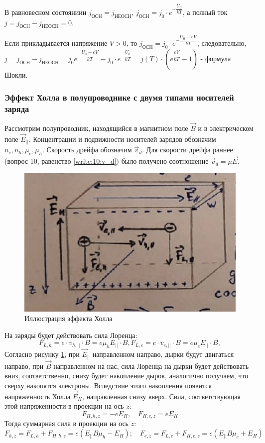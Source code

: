В равновесном состояниии $j_\text{ОСН} = j_\text{НЕОСН}$, $j_\text{ОСН} = j_0 \cdot e^{-\dfrac{U_0}{kT}}$, а полный ток $j = j_\text{ОСН} - j_\text{НЕОСН} = 0$.

Если прикладывается напряжение $V>0$, то $j_\text{ОСН} = j_0 \cdot e^{-\dfrac{U_0-eV}{kT}}$, следовательно, $j = j_\text{ОСН} - j_\text{НЕОСН} = j_0 e^{-\dfrac{U_0-eV}{kT}} - j_0 \cdot e^{-\dfrac{U_0}{kT}} = j(T) \cdot \left( e^{\dfrac{eV}{kT}} - 1 \right) $ - формула Шокли.

\subsubsection{Эффект Холла в полупроводнике с двумя типами носителей заряда}

Рассмотрим полупроводник, находящийся в магнитном поле $\vec{B}$ и в электрическом поле
$\vec{E}_{||}$.  Концентрации и подвижности носителей зарядов обозначим $n_e, n_h, \mu_e, \mu_h$.
Скорость дрейфа обозначим $\vec{v}_d$. Для скорости дрейфа раннее (вопрос 10, равенство
\eqref{write:10:v_d}) было получено соотношение $\vec{v}_d = \mu \vec{E}$.

\begin{figure}[H]
  \label{oral04:halleffect}
  \centering
  \includegraphics[width=0.9\linewidth]{img/oral-04/hall-effect.png}
  \caption{Иллюстрация эффекта Холла}
\end{figure}

На заряды будет действовать сила Лоренца:
\[
  F_{L, h} = e \cdot v_{h, ||} \cdot B = e \mu_h E_{||} \cdot B,
  F_{L, e} = e \cdot v_{e, ||} \cdot B = e \mu_e E_{||} \cdot B,
\]
Согласно рисунку \ref{oral04:halleffect}, при $\vec{E}_{||}$ направленном направо, дырки будут 
двигаться направо, при $\vec{B}$ направленном на нас, сила Лоренца на дырки будет действовать вниз,
соответственно, снизу будет накопление дырок, аналогично получаем, что сверху накопятся электроны.
Вследствие этого накопления появится напряженность Холла $\vec{E}_H$, направленная снизу вверх.
Сила, соответствующая этой напряженности в проекции на ось $z$:
\[
  F_{H, h, z} = -e E_{H}, \quad
  F_{H, e, z} = e E_{H}
\]
Тогда суммарная сила в проекции на ось $z$:
\[
  F_{h, z} = F_{L, h} + F_{H, h, z} = e \left( E_{||} B \mu_h - E_H \right); \quad
  F_{e, z} = F_{L, e} + F_{H, e, z} = e \left( E_{||} B \mu_e + E_H \right)
\]
